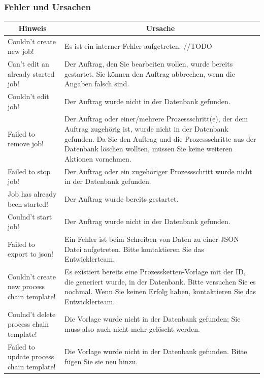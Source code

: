 \documentclass[enabledeprecatedfontcommands,fontsize=12pt,paper=a4,twoside]{scrartcl}
\begin{document}
\subsubsection{Fehler und Ursachen}
\begin{longtable}[c]{|p{5cm}|p{10cm}|}
\hline
\multicolumn{1}{|c|}{\textbf{Hinweis}}                          & \multicolumn{1}{c|}{\textbf{Ursache}}                                                                                                                                                                                                               \\ \hline
\endhead
Couldn't create new job! &Es ist ein interner Fehler aufgetreten. //TODO \\ \hline
Can't edit an already started job! & Der Auftrag, den Sie bearbeiten wollen, wurde bereits gestartet. Sie können den Auftrag abbrechen, wenn die Angaben falsch sind. \\ \hline
Couldn't edit job! & Der Auftrag wurde nicht in der Datenbank gefunden. \\ \hline
Failed to remove job! & Der Auftrag oder einer/mehrere Prozessschritt(e), der dem Auftrag zugehörig ist, wurde nicht in der Datenbank gefunden. Da Sie den Auftrag und die Prozessschritte aus der Datenbank löschen wollten, müssen Sie keine weiteren Aktionen vornehmen. \\ \hline
Failed to stop job!  & Der Auftrag oder ein zugehöriger Prozessschritt wurde nicht in der Datenbank gefunden.  \\ \hline
Job has already been started!  & Der Auftrag wurde bereits gestartet. \\ \hline
Coulnd't start job! & Der Auftrag wurde nicht in der Datenbank gefunden.\\ \hline
Failed to export to json! & Ein Fehler ist beim Schreiben von Daten zu einer JSON Datei aufgetreten. Bitte kontaktieren Sie das Entwicklerteam.  \\ \hline
Couldn't create new process chain template! & Es existiert bereits eine Prozessketten-Vorlage mit der ID, die generiert wurde, in der Datenbank. Bitte versuchen Sie es nochmal. Wenn Sie keinen Erfolg haben, kontaktieren Sie das Entwicklerteam. \\ \hline
Coulnd't delete process chain template! & Die Vorlage wurde nicht in der Datenbank gefunden; Sie muss also auch nicht mehr gelöscht werden. \\ \hline
Failed to update process chain template! & Die Vorlage wurde nicht in der Datenbank gefunden. Bitte fügen Sie sie neu hinzu. \\ \hline

\end{longtable}
\end{document}
